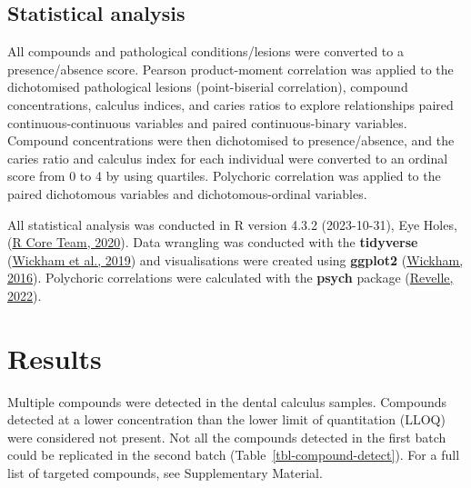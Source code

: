 \documentclass[
  b5paper,
]{book}
\begin{document}
\hypertarget{statistical-analysis-1}{%
\subsection{Statistical analysis}\label{statistical-analysis-1}}

All compounds and pathological conditions/lesions were converted to a
presence/absence score. Pearson product-moment correlation was applied
to the dichotomised pathological lesions (point-biserial correlation),
compound concentrations, calculus indices, and caries ratios to explore
relationships paired continuous-continuous variables and paired
continuous-binary variables. Compound concentrations were then
dichotomised to presence/absence, and the caries ratio and calculus
index for each individual were converted to an ordinal score from 0 to 4
by using quartiles. Polychoric correlation was applied to the paired
dichotomous variables and dichotomous-ordinal variables.

All statistical analysis was conducted in R version 4.3.2 (2023-10-31),
Eye Holes, (\protect\hyperlink{ref-Rbase}{R Core Team, 2020}). Data
wrangling was conducted with the \textbf{tidyverse}
(\protect\hyperlink{ref-tidyverse2019}{Wickham et al., 2019}) and
visualisations were created using \textbf{ggplot2}
(\protect\hyperlink{ref-ggplot2}{Wickham, 2016}). Polychoric
correlations were calculated with the \textbf{psych} package
(\protect\hyperlink{ref-Rpsych}{Revelle, 2022}).

\hypertarget{results-2}{%
\section{Results}\label{results-2}}

Multiple compounds were detected in the dental calculus samples.
Compounds detected at a lower concentration than the lower limit of
quantitation (LLOQ) were considered not present. Not all the compounds
detected in the first batch could be replicated in the second batch
(Table~\ref{tbl-compound-detect}). For a full list of targeted
compounds, see Supplementary Material.
\end{document}

